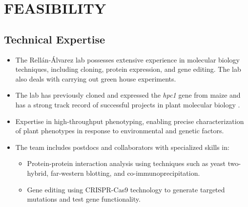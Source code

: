 \documentclass{article}
\begin{document}
\section{FEASIBILITY}

\subsection{Technical Expertise}
\begin{itemize}
    \item The Rell\'an-\'Alvarez lab possesses extensive experience in molecular biology techniques, including cloning, protein expression, and gene editing. The lab also deals with carrying out green house experiments.
    \item The lab has previously cloned and expressed the \textit{hpc1} gene from maize and has a strong track record of successful projects in plant molecular biology \cite{barnes2022adaptive}.
    \item Expertise in high-throughput phenotyping, enabling precise characterization of plant phenotypes in response to environmental and genetic factors.
    \item The team includes postdocs and collaborators with specialized skills in:
    \begin{itemize}
        \item Protein-protein interaction analysis using techniques such as yeast two-hybrid, far-western blotting, and co-immunoprecipitation.
        \item Gene editing using CRISPR-Cas9 technology to generate targeted mutations and test gene functionality.
    \end{itemize}
\end{itemize}
\end{document}
